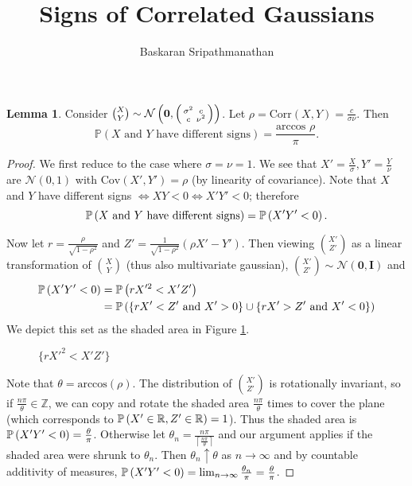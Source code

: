 \documentclass[conference]{article}
\newcommand{\matr}[1]{\bm{#1}}
\newcommand{\vect}[1]{\bm{#1}}
\theoremstyle{definition}
\newtheorem{lemma}[]{Lemma}
\begin{document}
\title{Signs of Correlated Gaussians}

\author{{Baskaran Sripathmanathan} }
\maketitle


\begin{lemma}
\label{lemma:gaussian_sign}
Consider $\binom{X}{Y} \sim \mathcal{N}\left( \vect{0}, \begin{psmallmatrix} \sigma^{2} & c \\ c & \nu^{2} \end{psmallmatrix} \right)$. Let $\rho = \text{Corr}(X,Y) = \frac{c}{\sigma\nu}$. Then
\begin{equation}
    \mathbb{P}\left( X \text{ and } Y \text{ have different signs}\right) = \frac{ \text{arccos }\rho }{\pi}.
\end{equation}
    
\end{lemma}
\begin{proof}

 We first reduce to the case where $\sigma=\nu=1$. We see that $X' = \frac{X}{\sigma}, Y' = \frac{Y}{\nu}$ are $\mathcal{N}(0,1)$ with $\text{Cov}(X',Y') = \rho$ (by linearity of covariance). Note that $X$ and $Y$ have different signs $\iff XY < 0 \iff X'Y' < 0$; therefore $$\prob{X \text{ and } Y \text{ have different signs}} = \prob{X'Y' < 0}.$$

\noindent Now let $r = \frac{\rho}{\sqrt{1-\rho^2}}$ and $Z' = \frac{1}{\sqrt{1-\rho^{2}}}(\rho X' - Y')$. Then viewing $\binom{X'}{Z'}$ as a linear transformation of $\binom{X}{Y}$ (thus also multivariate gaussian), $\binom{X'}{Z'} \sim \mathcal{N}\left(\vect{0}, \matr{I}\right)$ and 
\begin{align}
 \prob{X'Y'<0} &= \prob{rX'^{2} < X'Z'} \\
 &= \prob{\{rX' < Z' \text{ and } X' > 0\} \cup \{rX' > Z' \text{ and } X' < 0 \}}   
\end{align}
 We depict this set as the shaded area in Figure \ref{fig:proof_fig}. 
\begin{figure}[H]
    \centering
    
    \caption{$\{rX'^{2} < X'Z' \}$}
    \label{fig:proof_fig}
\end{figure}

Note that $\theta = \text{arccos}(\rho)$. The distribution of $\binom{X'}{Z'}$ is rotationally invariant, so if $\frac{n\pi}{\theta} \in \mathbb{Z}$, we can copy and rotate the shaded area $\frac{n\pi}{\theta}$ times to cover the plane (which corresponds to $\prob{X' \in \mathbb{R}, Z' \in \mathbb{R}} = 1$). Thus the shaded area is $\prob{X'Y'<0} = \frac{\theta}{\pi}$. Otherwise let $\theta_{n} = \frac{n\pi}{\left\lceil\frac{n\pi}{\theta} \right\rceil}$ and our argument applies if the shaded area were shrunk to $\theta_{n}$. Then $\theta_{n} \uparrow \theta$ as $n \to \infty$  and by countable additivity of measures, $\prob{X'Y' < 0} = \lim_{n\to\infty} \frac{\theta_{n}}{\pi} = \frac{\theta}{\pi}$.
\end{proof}
\end{document}
